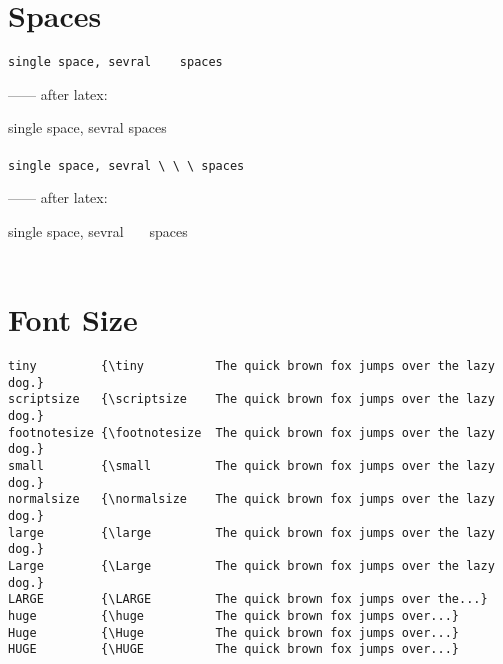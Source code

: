 \documentclass[a4paper,12pt]{article}
\begin{document}
\section*{Spaces}

\verb|single space, sevral    spaces|

------ after latex:

single space, sevral    spaces \\ \\


\verb|single space, sevral \ \ \ spaces|

------ after latex:

single space, sevral \ \ \ spaces \\ \\

\section*{Font Size}

\begin{verbatim}
tiny         {\tiny          The quick brown fox jumps over the lazy dog.}
scriptsize   {\scriptsize    The quick brown fox jumps over the lazy dog.}
footnotesize {\footnotesize  The quick brown fox jumps over the lazy dog.}
small        {\small         The quick brown fox jumps over the lazy dog.}
normalsize   {\normalsize    The quick brown fox jumps over the lazy dog.}
large        {\large         The quick brown fox jumps over the lazy dog.}
Large        {\Large         The quick brown fox jumps over the lazy dog.}
LARGE        {\LARGE         The quick brown fox jumps over the...}       
huge         {\huge          The quick brown fox jumps over...}           
Huge         {\Huge          The quick brown fox jumps over...}           
HUGE         {\HUGE          The quick brown fox jumps over...}           
\end{verbatim}
\end{document}
